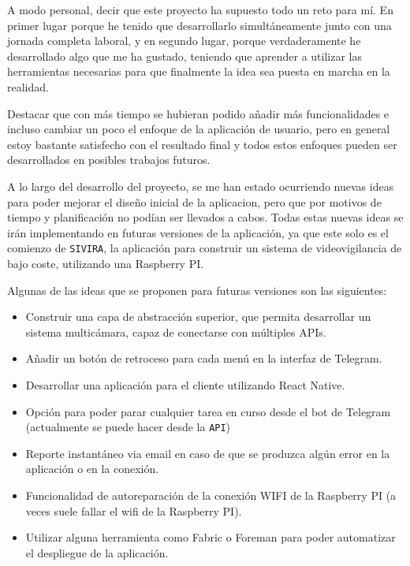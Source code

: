 A modo personal, decir que este proyecto ha supuesto todo un reto para mí. En primer lugar porque he tenido que desarrollarlo simultáneamente junto con una jornada completa laboral, y en segundo lugar, porque verdaderamente he desarrollado algo que me ha gustado, teniendo que aprender a utilizar las herramientas necesarias para que finalmente la idea sea puesta en marcha en la realidad.

Destacar que con más tiempo se hubieran podido añadir más funcionalidades e incluso cambiar un poco el enfoque de la aplicación de usuario, pero en general estoy bastante satisfecho con el resultado final y todos estos enfoques pueden ser desarrollados en posibles trabajos futuros.

A lo largo del desarrollo del proyecto, se me han estado ocurriendo nuevas ideas para poder mejorar el diseño inicial de la aplicacion, pero que por motivos de tiempo y planificación no podían ser llevados a cabos. Todas estas nuevas ideas se irán implementando en futuras versiones de la aplicación, ya que este solo es el comienzo de \texttt{SIVIRA}, la aplicación para construir un sistema de videovigilancia de bajo coste, utilizando una Raspberry PI.

Algunas de las ideas que se proponen para futuras versiones son las siguientes:

\begin{itemize}

\vspace{-0.3cm}

\item Construir una capa de abstracción superior, que permita desarrollar un sistema multicámara, capaz de conectarse con múltiples APIs.
\item Añadir un botón de retroceso para cada menú en la interfaz de Telegram.
\item Desarrollar una aplicación para el cliente utilizando React Native.
\item Opción para poder parar cualquier tarea en curso desde el bot de Telegram (actualmente se puede hacer desde la \texttt{API})
\item Reporte instantáneo via email en caso de que se produzca algún error en la aplicación o en la conexión.
\item Funcionalidad de autoreparación de la conexión WIFI de la Raspberry PI (a veces suele fallar el wifi de la Raspberry PI).
\item Utilizar alguna herramienta como Fabric o Foreman para poder automatizar el despliegue de la aplicación.

\end{itemize}